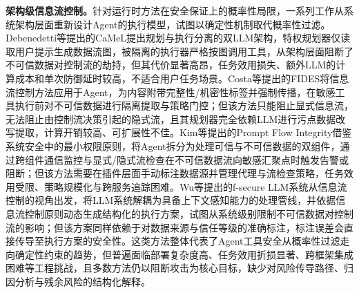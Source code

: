 \textbf{架构级信息流控制。}针对运行时方法在安全保证上的概率性局限，一系列工作从系统架构层面重新设计Agent的执行模型，试图以确定性机制取代概率性过滤。Debenedetti等\cite{debenedetti2025camel}提出的CaMeL提出规划与执行分离的双LLM架构，特权规划器仅读取用户提示生成数据流图，被隔离的执行器严格按图调用工具，从架构层面阻断了不可信数据对控制流的劫持，但其代价显著高昂，任务效用损失、额外LLM的计算成本和单次防御延时较高，不适合用户任务场景。Costa等\cite{costa2025fides}提出的FIDES将信息流控制方法应用于Agent，为内容附带完整性/机密性标签并强制传播，在敏感工具执行前对不可信数据进行隔离提取与策略门控；但该方法只能阻止显式信息流，无法阻止由控制流决策引起的隐式流，且其规划器完全依赖LLM进行污点数据改写提取，计算开销较高、可扩展性不佳。Kim等\cite{kim2025promptflow}提出的Prompt Flow Integrity借鉴系统安全中的最小权限原则，将Agent拆分为处理可信与不可信数据的双组件，通过跨组件通信监控与显式/隐式流检查在不可信数据流向敏感汇聚点时触发告警或阻断；但该方法需要在插件层面手动标注数据源并管理代理与流检查策略，任务效用受限、策略规模化与跨服务追踪困难。Wu等\cite{wu2024fsecure}提出的f-secure LLM系统从信息流控制的视角出发，将LLM系统解耦为具备上下文感知能力的处理管线，并依据信息流控制原则动态生成结构化的执行方案，试图从系统级别限制不可信数据对控制流的影响；但该方案同样依赖于对数据来源与信任等级的准确标注，标注误差会直接传导至执行方案的安全性。这类方法整体代表了Agent工具安全从概率性过滤走向确定性约束的趋势，但普遍面临部署复杂度高、任务效用折损显著、跨框架集成困难等工程挑战，且多数方法仍以阻断攻击为核心目标，缺少对风险传导路径、归因分析与残余风险的结构化解释。

